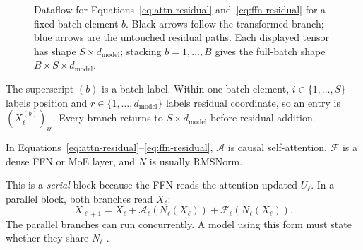\documentclass[11pt]{article}
\begin{document}
\begin{figure}[H]
{%
  }
  \caption{Dataflow for Equations~\eqref{eq:attn-residual}
  and~\eqref{eq:ffn-residual} for a fixed batch element $b$.  Black arrows follow
  the transformed branch; blue arrows are the untouched residual paths.  Each
  displayed tensor has shape $S\times d_{\mathrm{model}}$; stacking
  $b=1,\ldots,B$ gives the full-batch shape
  $B\times S\times d_{\mathrm{model}}$.}
  \label{fig:decoder-block-dataflow}
\end{figure}

The superscript $(b)$ is a batch label.  Within one batch element,
$i\in\{1,\ldots,S\}$ labels position and
$r\in\{1,\ldots,d_{\mathrm{model}}\}$ labels residual coordinate, so an entry is
$(X_\ell^{(b)})_{ir}$.  Every branch returns to
$S\times d_{\mathrm{model}}$ before residual addition.

In Equations~\eqref{eq:attn-residual}--\eqref{eq:ffn-residual}, $\mathcal{A}$ is
causal self-attention, $\mathcal{F}$ is a dense FFN or MoE layer, and $N$ is
usually RMSNorm.

This is a \emph{serial} block because the FFN reads the attention-updated
$U_\ell$.  In a parallel block, both branches read $X_\ell$:
\begin{equation}
  X_{\ell+1}
  =X_\ell
  +\mathcal{A}_\ell\!\left(N_\ell(X_\ell)\right)
  +\mathcal{F}_\ell\!\left(N_\ell(X_\ell)\right).
  \label{eq:parallel-block}
\end{equation}
The parallel branches can run concurrently.  A model using this form must state
whether they share $N_\ell$ \citep{hashimoto2026architecture}.
\end{document}
